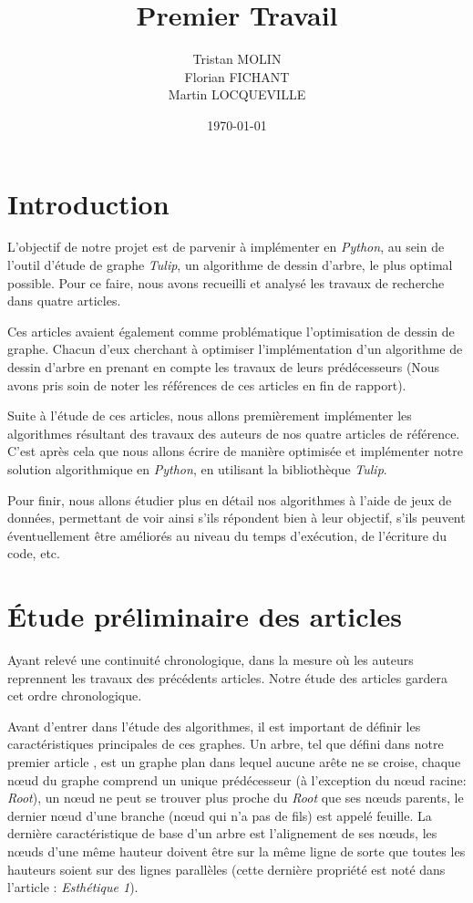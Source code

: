 \documentclass{article}
\title{Premier Travail}
\author{Tristan MOLIN\\Florian FICHANT\\Martin LOCQUEVILLE}
\date{\today}
\begin{document}
\maketitle

\tableofcontents

\newpage

\mainmatter

\section{Introduction}

L'objectif de notre projet est de parvenir à implémenter en \emph{Python}, au sein de l'outil d'étude de graphe \emph{Tulip}, un algorithme de dessin d'arbre, le plus optimal possible. Pour ce faire, nous avons recueilli et analysé les travaux de recherche dans quatre articles.

Ces articles avaient également comme problématique l'optimisation de dessin de graphe. Chacun d'eux cherchant à optimiser l'implémentation d'un algorithme de dessin d'arbre en prenant en compte les travaux de leurs prédécesseurs (Nous avons pris soin de noter les références de ces articles en fin de rapport).

Suite à l'étude de ces articles, nous allons premièrement implémenter les algorithmes résultant des travaux des auteurs de nos quatre articles de référence. C'est après cela que nous allons écrire de manière optimisée et implémenter notre solution algorithmique en \emph{Python}, en utilisant la bibliothèque \emph{Tulip}.

Pour finir, nous allons étudier plus en détail nos algorithmes à l'aide de jeux de données, permettant de voir ainsi s'ils répondent bien à leur objectif, s'ils peuvent éventuellement être améliorés au niveau du temps d'exécution, de l'écriture du code, etc.


\newpage
\section{Étude préliminaire des articles}

Ayant relevé une continuité chronologique, dans la mesure où les auteurs reprennent les travaux des précédents articles. Notre étude des articles gardera cet ordre chronologique.

Avant d'entrer dans l'étude des algorithmes, il est important de définir les caractéristiques principales de ces graphes. Un arbre, tel que défini dans notre premier article \cite{article79}, est un graphe plan dans lequel aucune arête ne se croise, chaque n\oe{}ud du graphe comprend un unique prédécesseur (à l'exception du n\oe{}ud racine: \emph{Root}), un n\oe{}ud ne peut se trouver plus proche du \emph{Root} que ses n\oe{}uds parents, le dernier n\oe{}ud d'une branche (n\oe{}ud qui n'a pas de fils) est appelé feuille. La dernière caractéristique de base d'un arbre est l'alignement de ses n\oe{}uds, les n\oe{}uds d’une même hauteur doivent être sur la même ligne de sorte que toutes les hauteurs soient sur des lignes parallèles (cette dernière propriété est noté dans l'article \cite{article79}: \emph{Esthétique 1}).
\end{document}
